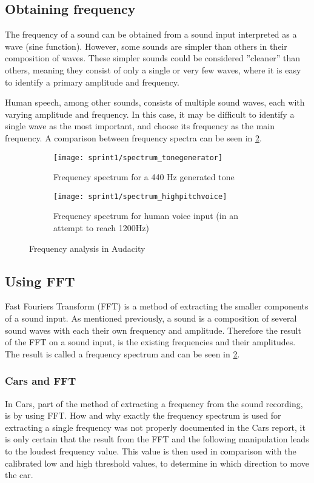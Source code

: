 \subsection{Obtaining frequency}\label{obtaining_frequency}
The frequency of a sound can be obtained from a sound input interpreted as a wave (sine function).
However, some sounds are simpler than others in their composition of waves.
These simpler sounds could be considered ''cleaner'' than others, meaning they consist of only a single or very few waves, where it is easy to identify a primary amplitude and frequency.

Human speech, among other sounds, consists of multiple sound waves, each with varying amplitude and frequency.
In this case, it may be difficult to identify a single wave as the most important, and choose its frequency as the main frequency.
A comparison between frequency spectra can be seen in \cref{fig:frequency_spectra}.

\begin{figure}[h]
\centering
\begin{subfigure}[t]{.45\textwidth}
\texttt{[image: sprint1/spectrum\_tonegenerator]}
\caption{Frequency spectrum for a 440 Hz generated tone}
\end{subfigure}
\begin{subfigure}[t]{.45\textwidth}
\texttt{[image: sprint1/spectrum\_highpitchvoice]}
\caption{Frequency spectrum for human voice input (in an attempt to reach 1200Hz)}
\label{fig:humanvoice_spectra}
\end{subfigure}
\caption{Frequency analysis in Audacity}
\label{fig:frequency_spectra}
\end{figure}

\subsection{Using FFT}
Fast Fouriers Transform (FFT) is a method of extracting the smaller components of a sound input.
As mentioned previously, a sound is a composition of several sound waves with each their own frequency and amplitude.
Therefore the result of the FFT on a sound input, is the existing frequencies and their amplitudes.
The result is called a frequency spectrum and can be seen in \cref{fig:frequency_spectra}.

\subsubsection{Cars and FFT}
In Cars, part of the method of extracting a frequency from the sound recording, is by using FFT.
How and why exactly the frequency spectrum is used for extracting a single frequency was not properly documented in the Cars report, it is only certain that the result from the FFT and the following manipulation leads to the loudest frequency value.
This value is then used in comparison with the calibrated low and high threshold values, to determine in which direction to move the car.

